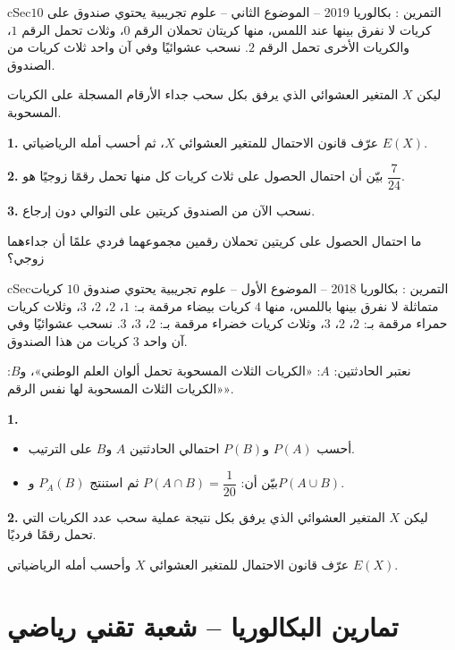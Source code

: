 \documentclass[12pt,a4paper]{article}
\newenvironment{BOX}[2]{\begin{otherlanguage}{english}\begin{arbox}{#1}{#2}}{\end{arbox}\end{otherlanguage}}
\newcounter{exo}
\newenvironment{tamrin}[1]{\stepcounter{exo}\begin{BOX}{cSec}{التمرين \theexo: #1}}{\end{BOX}}
\newenvironment{sq}{\begin{itemize}[leftmargin=2.4em,itemsep=3pt]}{\end{itemize}}
\newcommand{\qa}{\item[(أ)]}\newcommand{\qb}{\item[(ب)]}\newcommand{\qc}{\item[(جـ)]}\newcommand{\qd}{\item[(د)]}\newcommand{\qe}{\item[(هـ)]}
\newcommand{\QQ}[1]{\par\smallskip\textbf{#1.} }
\begin{document}
\begin{tamrin}{بكالوريا 2019 -- الموضوع الثاني -- علوم تجريبية}
يحتوي صندوق على $10$ كريات لا نفرق بينها عند اللمس، منها كريتان تحملان الرقم $0$، وثلاث تحمل الرقم $1$، والكريات الأخرى تحمل الرقم $2$. نسحب عشوائيًا وفي آن واحد ثلاث كريات من الصندوق.

ليكن $X$ المتغير العشوائي الذي يرفق بكل سحب جداء الأرقام المسجلة على الكريات المسحوبة.
\QQ{1} عرّف قانون الاحتمال للمتغير العشوائي $X$، ثم أحسب أمله الرياضياتي $E(X)$.
\QQ{2} بيّن أن احتمال الحصول على ثلاث كريات كل منها تحمل رقمًا زوجيًا هو $\dfrac{7}{24}$.
\QQ{3} نسحب الآن من الصندوق كريتين على التوالي دون إرجاع.

ما احتمال الحصول على كريتين تحملان رقمين مجموعهما فردي علمًا أن جداءهما زوجي؟
\end{tamrin}

\begin{tamrin}{بكالوريا 2018 -- الموضوع الأول -- علوم تجريبية}
يحتوي صندوق $10$ كريات متماثلة لا نفرق بينها باللمس، منها $4$ كريات بيضاء مرقمة بـ: $1$، $2$، $2$، $3$، وثلاث كريات حمراء مرقمة بـ: $2$، $2$، $3$، وثلاث كريات خضراء مرقمة بـ: $2$، $3$، $3$.
نسحب عشوائيًا وفي آن واحد $3$ كريات من هذا الصندوق.

نعتبر الحادثتين: $A$: «الكريات الثلاث المسحوبة تحمل ألوان العلم الوطني»، و$B$: «الكريات الثلاث المسحوبة لها نفس الرقم».
\QQ{1}
\begin{sq}
\qa أحسب $P(A)$ و$P(B)$ احتمالي الحادثتين $A$ و$B$ على الترتيب.
\qb بيّن أن: $P(A\cap B)=\dfrac{1}{20}$ ثم استنتج $P_A(B)$ و$P(A\cup B)$.
\end{sq}
\QQ{2} ليكن $X$ المتغير العشوائي الذي يرفق بكل نتيجة عملية سحب عدد الكريات التي تحمل رقمًا فرديًا.

عرّف قانون الاحتمال للمتغير العشوائي $X$ وأحسب أمله الرياضياتي $E(X)$.
\end{tamrin}

\section{تمارين البكالوريا -- شعبة تقني رياضي}
\end{document}
